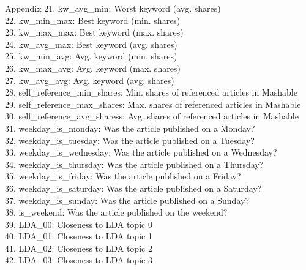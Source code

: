 \documentclass[a4paper,11pt]{article}
\begin{document}
\begin{section}{Appendix}
    21. kw\_avg\_min:                    Worst keyword (avg. shares)\\
    22. kw\_min\_max:                    Best keyword (min. shares)\\
    23. kw\_max\_max:                    Best keyword (max. shares)\\
    24. kw\_avg\_max:                    Best keyword (avg. shares)\\
    25. kw\_min\_avg:                    Avg. keyword (min. shares)\\
    26. kw\_max\_avg:                    Avg. keyword (max. shares)\\
    27. kw\_avg\_avg:                    Avg. keyword (avg. shares)\\
    28. self\_reference\_min\_shares:     Min. shares of referenced articles in
                                       Mashable\\
    29. self\_reference\_max\_shares:     Max. shares of referenced articles in
                                       Mashable\\
    30. self\_reference\_avg\_sharess:    Avg. shares of referenced articles in
                                       Mashable\\
    31. weekday\_is\_monday:             Was the article published on a Monday?\\
    32. weekday\_is\_tuesday:            Was the article published on a Tuesday?\\
    33. weekday\_is\_wednesday:          Was the article published on a Wednesday?\\
    34. weekday\_is\_thursday:           Was the article published on a Thursday?\\
    35. weekday\_is\_friday:             Was the article published on a Friday?\\
    36. weekday\_is\_saturday:           Was the article published on a Saturday?\\
    37. weekday\_is\_sunday:             Was the article published on a Sunday?\\
    38. is\_weekend:                    Was the article published on the weekend?\\
    39. LDA\_00:                        Closeness to LDA topic 0\\
    40. LDA\_01:                        Closeness to LDA topic 1\\
    41. LDA\_02:                        Closeness to LDA topic 2\\
    42. LDA\_03:                        Closeness to LDA topic 3\\

\end{section}
\end{document}
